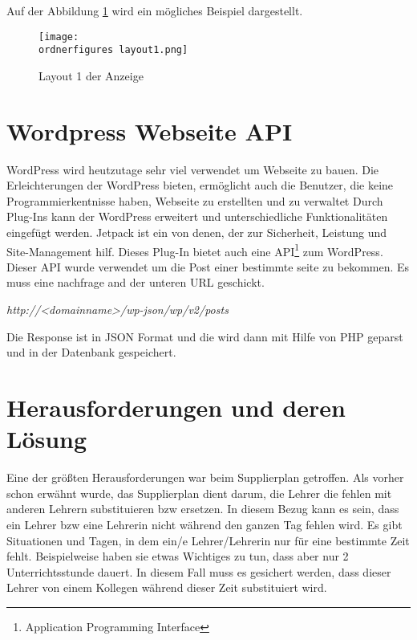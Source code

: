  Auf der Abbildung \ref{fi:layout1} wird ein mögliches Beispiel dargestellt.

\begin{figure}[H]
	\centering
	\texttt{[image: \\ordnerfigures layout1.png]}
	\caption{Layout 1 der Anzeige}
	\label{fi:layout1}
\end{figure}


\section{Wordpress Webseite API}


WordPress wird heutzutage sehr viel verwendet um Webseite zu bauen. Die Erleichterungen der WordPress bieten, ermöglicht auch die Benutzer, die keine Programmierkentnisse haben, Webseite zu erstellten und zu verwaltet Durch Plug-Ins kann der WordPress erweitert und unterschiedliche Funktionalitäten eingefügt werden. Jetpack ist ein von denen, der zur Sicherheit, Leistung und Site-Management hilf. Dieses Plug-In bietet auch eine API\footnote{Application Programming Interface} zum WordPress. Dieser API wurde verwendet um die Post einer bestimmte seite zu bekommen. Es muss eine nachfrage and der unteren URL geschickt.


\begin{center}
	\textit{http://\textless{}\textit{domainname}\textgreater{}/wp-json/wp/v2/posts}

\end{center}


Die Response ist in JSON Format und die wird dann mit Hilfe von PHP geparst und in der Datenbank gespeichert. 


\section{Herausforderungen und deren Lösung}

Eine der größten Herausforderungen war beim Supplierplan getroffen. Als vorher schon erwähnt wurde, das Supplierplan dient darum, die Lehrer die fehlen mit anderen Lehrern substituieren bzw ersetzen. In diesem Bezug kann es sein, dass ein Lehrer bzw eine Lehrerin nicht während den ganzen Tag fehlen wird. Es gibt Situationen und Tagen, in dem ein/e Lehrer/Lehrerin nur für eine bestimmte Zeit fehlt. Beispielweise haben sie etwas Wichtiges zu tun, dass aber nur 2 Unterrichtsstunde dauert. In diesem Fall muss es gesichert werden, dass dieser Lehrer von einem Kollegen während dieser Zeit substituiert wird.


